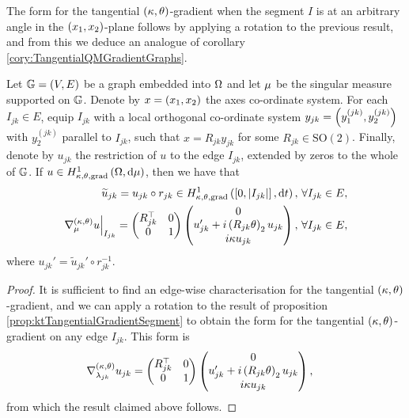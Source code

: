 The form for the tangential $\left( \kappa, \theta \right)$-gradient when the segment $I$ is at an arbitrary angle in the $\left( x_1,x_2 \right)$-plane follows by applying a rotation to the previous result, and from this we deduce an analogue of corollary \ref{cory:TangentialQMGradientGraphs}.
\begin{cory} \label{cory:ktTangentialGradientForm}
	Let $\mathbb{G}=\left( V,E \right)$ be a graph embedded into $\Omega$ and let $\mu$ be the singular measure supported on $\mathbb{G}$.
	Denote by $x=\left( x_1,x_2 \right)$ the axes co-ordinate system.
	For each $I_{jk}\in E$, equip $I_{jk}$ with a local orthogonal co-ordinate system $y_{jk}=\left( y^{(jk)}_1,y^{(jk)}_2 \right)$ with $y^{(jk)}_2$ parallel to $I_{jk}$, such that $x=R_{jk}y_{jk}$ for some $R_{jk}\in\mathrm{SO}(2)$.
	Finally, denote by $u_{jk}$ the restriction of $u$ to the edge $I_{jk}$, extended by zeros to the whole of $\mathbb{G}$.
	If $u\in H^1_{\kappa,\theta,\mathrm{grad}}\left( \Omega, \mathrm{d}\mu \right)$, then we have that
	\begin{align*}
		\widetilde{u}_{jk} = u_{jk} \circ r_{jk} \in H^1_{\kappa,\theta,\mathrm{grad}}\left( \left[ 0,\left\lvert I_{jk} \right\rvert \right], \mathrm{d}t \right), &\ \forall I_{jk}\in E, \\
		\left.\nabla^{\left( \kappa, \theta \right)}_{\mu}u\right\vert_{I_{jk}} = \begin{pmatrix} R_{jk}^{\top} & 0 \\ 0 & 1 \end{pmatrix} \begin{pmatrix} 0 \\ u_{jk}' + i\left( R_{jk}\theta \right)_2 u_{jk} \\ i\kappa u_{jk} \end{pmatrix}, &\ \forall I_{jk}\in E,
	\end{align*}
	where $u_{jk}' = \widetilde{u}_{jk}' \circ r_{jk}^{-1}$.
\end{cory}
\begin{proof}
	It is sufficient to find an edge-wise characterisation for the tangential $\left( \kappa, \theta \right)$-gradient, and we can apply a rotation to the result of proposition \ref{prop:ktTangentialGradientSegment} to obtain the form for the tangential $\left( \kappa, \theta \right)$-gradient on any edge $I_{jk}$.
	This form is
	\begin{align*}
		\nabla^{\left( \kappa, \theta \right)}_{\lambda_{jk}}u_{jk} &= \begin{pmatrix} R_{jk}^{\top} & 0 \\ 0 & 1 \end{pmatrix} \begin{pmatrix} 0 \\ u_{jk}' + i\left( R_{jk}\theta \right)_2 u_{jk} \\ i\kappa u_{jk} \end{pmatrix},
	\end{align*}
	from which the result claimed above follows.
\end{proof}

